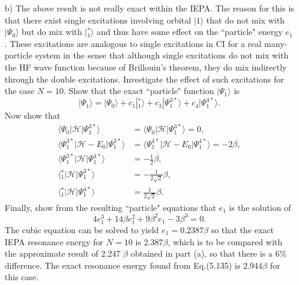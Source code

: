 \documentclass[a4paper]{book}
\newcounter{exercise}[chapter]
\newcounter{solution}[chapter]
\begin{document}
\begin{exercise}
\begin{enumerate}
	\item[b)] The above result is not really exact within the IEPA. The reason for this is that there exist single excitations involving orbital $|1\rangle$ that do not mix with $|\Psi_0\rangle$ but do mix with $|{}^{*}_1 \rangle$ and thus have some effect on the ``particle" energy $e_1$. These excitations are analogous to single excitations in CI for a real many-particle system in the sense that although single excitations do not mix with the HF wave function because of Brillouin's theorem, they do mix indirectly through the double excitations. Investigate the effect of such excitations for the case $N=10$. Show that the exact ``particle" function $| \Psi_1 \rangle$ is
	\[
		| \Psi_1 \rangle = | \Psi_0 \rangle + c_1 |{}^{*}_1 \rangle + c_3 | \Psi^{3*}_1 \rangle + c_4 | \Psi^{4*}_1 \rangle.
	\]
	Now show that
	\begin{align*}
		\langle \Psi_0 | \mathscr{H} | \Psi^{3*}_1 \rangle &= \langle \Psi_0 | \mathscr{H} | \Psi^{3*}_1 \rangle = 0, \\
		\langle \Psi^{3*}_1 | \mathscr{H} - E_0 | \Psi^{3*}_1 \rangle &= \langle \Psi^{4*}_1 | \mathscr{H} - E_0 | \Psi^{4*}_1 \rangle = -2 \beta , \\
		\langle \Psi^{3*}_1 | \mathscr{H} | \Psi^{4*}_1 \rangle &= -\frac{1}{2} \beta , \\
		\langle {}^{*}_1 | \mathscr{H} | \Psi^{3*}_1 \rangle &= -\frac{1}{2\sqrt{2}} \beta , \\
		\langle {}^{*}_1 | \mathscr{H} | \Psi^{4*}_1 \rangle &= \frac{1}{2\sqrt{2}} \beta.
	\end{align*}
	Finally, show from  the resulting ``particle" equations that $e_1$ is the solution of 
	\[
		4e^3_1 + 14 \beta e^2_1 + 9 \beta^2 e_1 - 3\beta^3 = 0.
	\]
	The cubic equation can be solved to yield $e_1 = 0.2387 \beta$ so that the exact IEPA resonance energy for $N=10$ is 2.387$\beta$, which is to be compared with the approximate result of 2.247 $\beta$ obtained in part (a), so that there is a 6\% difference. The exact resonance energy found from Eq.(5.135) is 2.944$\beta$ for this case.
	\end{enumerate}
	\end{exercise}
	
\end{document}
